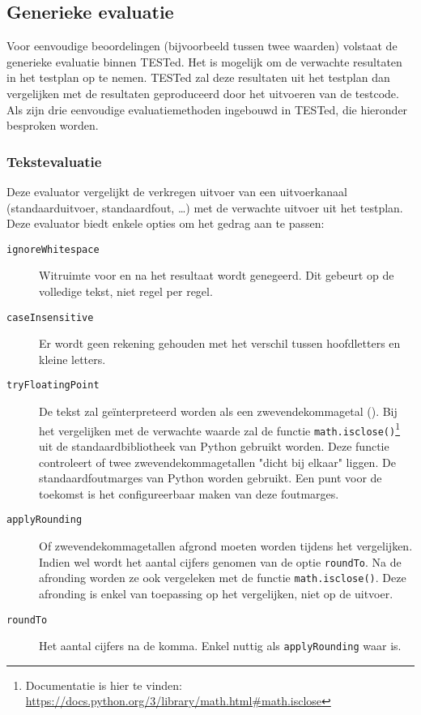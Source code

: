 \subsection{Generieke evaluatie}\label{subsec:ingebouwde-evaluator}

Voor eenvoudige beoordelingen (bijvoorbeeld tussen twee waarden) volstaat de generieke evaluatie binnen TESTed.
Het is mogelijk om de verwachte resultaten in het testplan op te nemen.
TESTed zal deze resultaten uit het testplan dan vergelijken met de resultaten geproduceerd door het uitvoeren van de testcode.
Als  zijn drie eenvoudige evaluatiemethoden ingebouwd in TESTed, die hieronder besproken worden.

\subsubsection{Tekstevaluatie}

Deze evaluator vergelijkt de verkregen uitvoer van een uitvoerkanaal (standaarduitvoer, standaardfout, \ldots) met de verwachte uitvoer uit het testplan.
Deze evaluator biedt enkele opties om het gedrag aan te passen:

\begin{description}
    \item[\texttt{ignoreWhitespace}]
    Witruimte voor en na het resultaat wordt genegeerd.
    Dit gebeurt op de volledige tekst, niet regel per regel.
    \item[\texttt{caseInsensitive}] Er wordt geen rekening gehouden met het verschil tussen hoofdletters en kleine letters.
    \item[\texttt{tryFloatingPoint}]
    De tekst zal geïnterpreteerd worden als een zwevendekommagetal ().
    Bij het vergelijken met de verwachte waarde zal de functie \texttt{math.isclose()}\footnote{Documentatie is hier te vinden: \url{https://docs.python.org/3/library/math.html\#math.isclose}} uit de standaardbibliotheek van Python gebruikt worden.
    Deze functie controleert of twee zwevendekommagetallen "dicht bij elkaar" liggen.
    De standaardfoutmarges van Python worden gebruikt.
    Een punt voor de toekomst is het configureerbaar maken van deze foutmarges.
    \item[\texttt{applyRounding}] Of zwevendekommagetallen afgrond moeten worden tijdens het vergelijken.
    Indien wel wordt het aantal cijfers genomen van de optie \texttt{roundTo}.
    Na de afronding worden ze ook vergeleken met de functie \texttt{math.isclose()}.
    Deze afronding is enkel van toepassing op het vergelijken, niet op de uitvoer.
    \item[\texttt{roundTo}] Het aantal cijfers na de komma.
    Enkel nuttig als \texttt{applyRounding} waar is.
\end{description}

